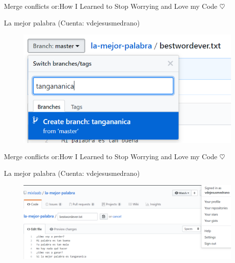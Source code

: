 \documentclass[10pt]{beamer}
\begin{document}
\begin{frame}{Merge conflicts or:}{How I Learned to Stop Worrying and Love my Code $\heartsuit$}

\begin{block}{La mejor palabra (Cuenta: vdejesusmedrano)}

\begin{figure}[h!]
\centering
\includegraphics [scale=0.3]{tangananicabranch}
\label{fig:issues}
\end{figure}
    
\end{block}

\end{frame}

\begin{frame}{Merge conflicts or:}{How I Learned to Stop Worrying and Love my Code $\heartsuit$}

\begin{block}{La mejor palabra (Cuenta: vdejesusmedrano)}

\begin{figure}[h!]
\centering
\includegraphics [scale=0.25]{tangananica}
\label{fig:issues}
\end{figure}
    
\end{block}

\end{frame}
\end{document}
